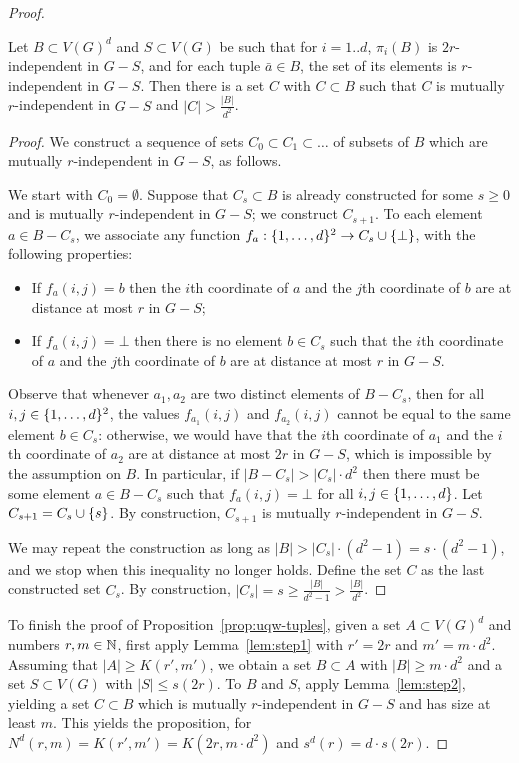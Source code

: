 \begin{proof}
\begin{lemma}\label{lem:step2}
	Let $B\subset V(G)^d$ and $S\subset V(G)$ be such that for  $i=1..d$,
	$\pi_i(B)$ is $2r$-independent in $G-S$, and for each tuple $\bar a\in B$, the set of its elements is $r$-independent in $G-S$.  
	Then there is a set $C$ with $C\subset B$ 
	such that $C$ is mutually $r$-independent in $G-S$
	and $|C|> \frac{|B|}{d^2}$.
\end{lemma}
\begin{proof}
We construct a sequence of sets $C_0\subset C_1\subset \ldots$ of subsets of $B$ which are mutually $r$-independent in $G-S$, as follows.

We start with $C_0=\emptyset$. Suppose that $C_s\subset B$ is 
 already constructed for some $s\ge 0$
 and is mutually $r$-independent in $G-S$; we construct $C_{s+1}$.  To each element $a\in B-C_s$,
we associate any function $f_a:\{1,\ldots,d\}^2\to C_s\cup \{\bot\}$,
with the following properties:
\begin{itemize}
	\item If $f_a(i,j)=b$ then the $i$th coordinate of $a$
	and the $j$th coordinate of $b$ are at distance at most $r$
	in $G-S$;
	\item If $f_a(i,j)=\bot$ then there is no element $b\in C_s$ 
	such that the $i$th coordinate of $a$ and the $j$th coordinate of $b$ are at distance at most $r$ in $G-S$.	
\end{itemize}
Observe that whenever $a_1, a_2$ are two distinct elements of $B-C_s$,
then for all $i,j\in \{1,\ldots,d\}^2$, the values $f_{a_1}(i,j)$ and $f_{a_2}(i,j)$
cannot be equal to the same element $b\in C_s$:
otherwise, we would have that the $i$th coordinate of $a_1$
and the $i$th coordinate of $a_2$ are at distance at most $2r$
in $G-S$, which is impossible by the assumption on $B$.
In particular, if $|B-C_s|> |C_s|\cdot d^2$
then there must be some element  $a\in B-C_s$  
such that $f_a(i,j)=\bot$  for all $i,j\in\{1,\ldots,d\}$.
Let $C_{s+1}=C_s\cup \{s\}$.
By construction, $C_{s+1}$ is mutually $r$-independent in $G-S$.

We may repeat the construction as long as $|B|>|C_s|\cdot (d^2-1)=s\cdot (d^2-1)$, and we stop when this inequality no longer holds. Define the set $C$ as the last constructed set $C_s$.
By construction, $|C_s|=s\ge 
\frac{|B|}{d^2-1}>\frac{|B|}{d^2}$.	
\end{proof}

To finish the proof of Proposition~\ref{prop:uqw-tuples},
given a set $A\subset V(G)^d$ and numbers $r,m\in\mathbb{N}$,
first apply 
Lemma~\ref{lem:step1} 
  with $r'=2r$ and
 $m'= m\cdot d^2$.
 Assuming that $|A|\ge K(r',m')$, 
we obtain a set $B\subset A$ with $|B|\ge m\cdot d^2$ and a set $S\subset V(G)$ with $|S|\le s(2r)$.
To $B$ and $S$, apply Lemma~\ref{lem:step2}, yielding a set $C\subset B$ which is mutually $r$-independent in $G-S$ and has size at least $m$. This yields the proposition, for $N^d(r,m)=K(r',m')=K(2r,m\cdot d^2)$
and $s^d(r)=d\cdot s(2r)$.
\end{proof}


